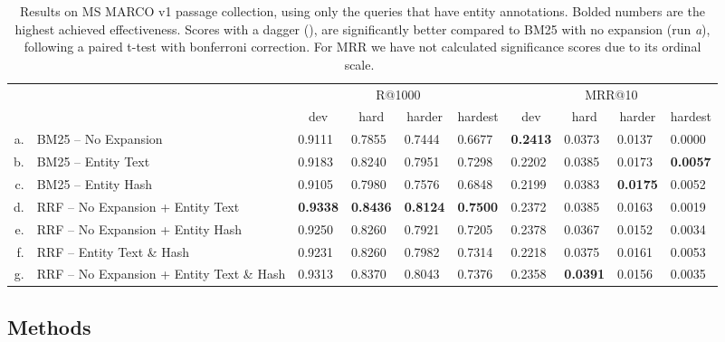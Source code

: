 \begin{table}[!t]
\centering
\caption{Results on MS MARCO v1 passage collection, using only the queries that have entity annotations. Bolded numbers are the highest achieved effectiveness. Scores with a dagger (\dag), are significantly better compared to BM25 with no expansion (run \emph{a}), following a paired t-test with bonferroni correction. For MRR we have not calculated significance scores due to its ordinal scale.~\citep{fuhr-mrr}}
\begin{tabular}{rl|llll|llll}
	\toprule
	\multirow{2}{*}{}
	& & \multicolumn{4}{c|}{R@1000} & \multicolumn{4}{c}{MRR@10} \\
	& & \multicolumn{1}{c}{dev} & \multicolumn{1}{c}{hard} & \multicolumn{1}{c}{harder} & \multicolumn{1}{c|}{hardest} & \multicolumn{1}{c}{dev} & \multicolumn{1}{c}{hard} & \multicolumn{1}{c}{harder} & \multicolumn{1}{c}{hardest} \\
	\midrule
	a. & BM25 -- No Expansion                           & 0.9111 & 0.7855 & 0.7444 & 0.6677 & \textbf{0.2413} & 0.0373 & 0.0137 & 0.0000 \\
	b. & BM25 -- Entity Text                            & 0.9183 & 0.8240\dag & 0.7951\dag & 0.7298\dag & 0.2202 & 0.0385 & 0.0173 & \textbf{0.0057} \\
	c. & BM25 -- Entity Hash                            & 0.9105 & 0.7980 & 0.7576 & 0.6848 & 0.2199 & 0.0383 & \textbf{0.0175} & 0.0052 \\ \midrule
	d. & RRF -- No Expansion + Entity Text                & \textbf{0.9338}\dag & \textbf{0.8436}\dag & \textbf{0.8124}\dag & \textbf{0.7500}\dag & 0.2372 & 0.0385 & 0.0163 & 0.0019 \\
	e. & RRF --  No Expansion + Entity Hash                & 0.9250\dag & 0.8260\dag & 0.7921\dag & 0.7205\dag & 0.2378 & 0.0367 & 0.0152 & 0.0034 \\
	f. & RRF -- Entity Text \& Hash                 & 0.9231 & 0.8260\dag & 0.7982\dag & 0.7314\dag & 0.2218 & 0.0375 & 0.0161 & 0.0053 \\
	g. & RRF -- No Expansion + Entity Text \& Hash  & 0.9313\dag & 0.8370\dag & 0.8043\dag & 0.7376\dag & 0.2358 & \textbf{0.0391} & 0.0156 & 0.0035 \\
	\bottomrule 
\end{tabular}
\label{tab:results-table}
\end{table}

\subsection{Methods}

